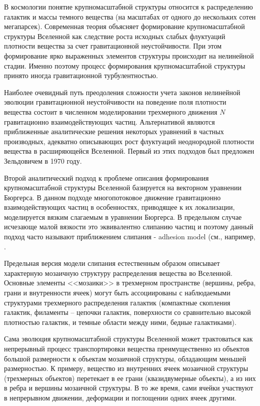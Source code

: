 В космологии понятие крупномасштабной структуры относится к распределению галактик и массы темного вещества (на масштабах от одного до нескольких сотен мегапарсек). Современная теория объясняет формирование крупномасштабной структуры Вселенной как следствие роста исходных слабых флуктуаций плотности вещества за счет гравитационной неустойчивости. При этом формирование ярко выраженных элементов структуры происходит на нелинейной стадии. Именно поэтому процесс формирования крупномасштабной структуры принято иногда гравитационной турбулентностью.

Наиболее очевидный путь преодоления сложности учета законов нелинейной эволюции гравитационной неустойчивости на поведение поля плотности вещества состоит в численном моделировании трехмерного движения $N$ гравитационно взаимодействующих частиц. Альтернативой являются приближенные аналитические решения некоторых уравнений в частных производных, адекватно описывающих рост флуктуаций неоднородной плотности вещества в расширяющейся Вселенной. Первый из этих подходов был предложен Зельдовичем в 1970 году.

Второй аналитический подход к проблеме описания формирования крупномасштабной структуры Вселенной \cite{a1} базируется на векторном уравнении Бюргерса. В данном подходе многопотоковое движение гравитационно взаимодействующих частиц в особенностях, приводящее к их локализации, моделируется вязким слагаемым в уравнении Бюргерса. В предельном случае исчезающе малой вязкости это эквивалентно слипанию частиц и поэтому данный подход часто называют приближением слипания - adhesion model (см., например, \cite{a2,a3,a4,a5}. 

Предельная версия модели слипания естественным образом описывает характерную мозаичную структуру распределения вещества во Вселенной. Основные элементы <<мозаики>> в трехмерном пространстве (вершины, ребра, грани и внутренности ячеек) могут быть ассоциированы с наблюдаемыми структурами трехмерного распределения галактик (компактные скопления галактик, филаменты -- цепочки галактик, поверхности со сравнительно высокой плотностью галактик, и темные области между ними, бедные галактиками).

Сама эволюция крупномасштабной структуры Вселенной может трактоваться как непрерывный процесс транспортировки вещества преимущественно из объектов большой размерности к объектам мозаичной структуры, обладающим меньшей размерностью. К примеру, вещество из внутренних ячеек мозаичной структуры (трехмерных объектов) перетекает в ее грани (квазидвумерные объекты), а из них в ребра и вершины мозаичной структуры. В то же время, сами ячейки участвуют в непрерывном движении, деформации и поглощении одних ячеек другими.

